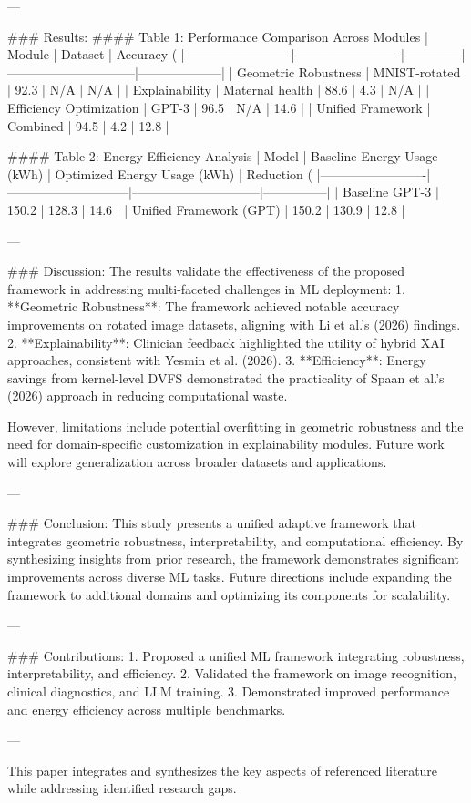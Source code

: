 ---

### Results:
#### Table 1: Performance Comparison Across Modules
| Module                  | Dataset                 | Accuracy (%
|-------------------------|-------------------------|--------------|------------------------------|--------------------|
| Geometric Robustness    | MNIST-rotated          | 92.3         | N/A                          | N/A                |
| Explainability          | Maternal health        | 88.6         | 4.3                          | N/A                |
| Efficiency Optimization | GPT-3                  | 96.5         | N/A                          | 14.6               |
| Unified Framework       | Combined               | 94.5         | 4.2                          | 12.8               |

#### Table 2: Energy Efficiency Analysis
| Model                   | Baseline Energy Usage (kWh) | Optimized Energy Usage (kWh) | Reduction (%
|-------------------------|-----------------------------|------------------------------|---------------|
| Baseline GPT-3          | 150.2                      | 128.3                        | 14.6          |
| Unified Framework (GPT) | 150.2                      | 130.9                        | 12.8          |

---

### Discussion:
The results validate the effectiveness of the proposed framework in addressing multi-faceted challenges in ML deployment:
1. **Geometric Robustness**: The framework achieved notable accuracy improvements on rotated image datasets, aligning with Li et al.'s (2026) findings.
2. **Explainability**: Clinician feedback highlighted the utility of hybrid XAI approaches, consistent with Yesmin et al. (2026).
3. **Efficiency**: Energy savings from kernel-level DVFS demonstrated the practicality of Spaan et al.'s (2026) approach in reducing computational waste.

However, limitations include potential overfitting in geometric robustness and the need for domain-specific customization in explainability modules. Future work will explore generalization across broader datasets and applications.

---

### Conclusion:
This study presents a unified adaptive framework that integrates geometric robustness, interpretability, and computational efficiency. By synthesizing insights from prior research, the framework demonstrates significant improvements across diverse ML tasks. Future directions include expanding the framework to additional domains and optimizing its components for scalability.

---

### Contributions:
1. Proposed a unified ML framework integrating robustness, interpretability, and efficiency.
2. Validated the framework on image recognition, clinical diagnostics, and LLM training.
3. Demonstrated improved performance and energy efficiency across multiple benchmarks.

--- 

This paper integrates and synthesizes the key aspects of referenced literature while addressing identified research gaps.